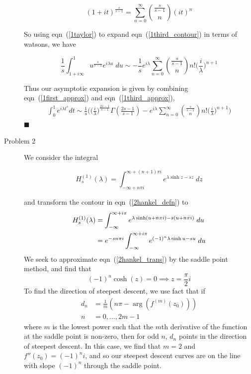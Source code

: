 \documentclass[11pt]{article}
\newcommand{\eq}[1]{\begin{align*}#1\end{align*}}
\newcommand{\eqn}[2]{
  \begin{equation}
    \label{#1}
    #2
  \end{equation}
}
\newcommand{\lam}{\lambda}
\newcommand{\eqr}[1]{eqn~(\ref{#1})}
\begin{document}
\begin{description}
\eqn{1taylor}{
  (1 + it)^\frac{s}{s-1} = 
  \sum_{n=0}^\infty
  \binom{\frac{s}{s-1}}{n}
  (it)^n
}
So using \eqr{1taylor} to expand \eqr{1third_contour} in terms of watsons, we have
\eqn{1third_approx}{
  \frac{1}{s} \int_{1+i\infty}^{1} u^\frac{s}{s-1} e^{i\lam u} \; du
  \sim
  -\frac{1}{s}
  e^{i\lam}
  \sum_{n=0}^\infty
  \binom{\frac{s}{s-1}}{n}
  n!
  \bigg(\frac{i}{\lam}\bigg)^{n+1}
}
Thus our asymptotic expansion is given by combining \eqr{1first_approx} and \eqr{1third_approx},
\eq{
  \int_0^1 e^{i\lam t^s} dt
  \sim
  \frac{1}{s}
  \Bigg(
    \bigg(\frac{i}{\lam}\bigg)^\frac{2s-1}{s-1}
    \Gamma(
      \frac{2s-1}{s-1}
    )
    -
    e^{i\lam}
    \sum_{n=0}^\infty
    \binom{\frac{s}{s-1}}{n}
    n!
    \bigg(\frac{i}{\lam}\bigg)^{n+1}
  \Bigg)
}
\hfill $\blacksquare$
\item[Problem 2]
We consider the integral
\eqn{2hankel_defn}{
  H_s^{(1)}(\lam) = \int_{
    -\infty + n\pi i
  }^{
    \infty + (n+1)\pi i
  }
  e^{
    \lam\sinh z - sz
  }
  \; dz
}
and transform the contour in \eqr{2hankel_defn} to
\begin{align}
  \notag
  H_s^{(1)}(\lam) &= \int
  _{-\infty}
  ^{\infty + i\pi}
  e^{
    \lam \sinh(u + n\pi i) - s(u + n\pi i)
  }
  \; du
  \\
  \label{2hankel_trans}
  &=
  e^{-sn\pi i}
  \int
  _{-\infty}
  ^{\infty + i\pi}
  e^{
    (-1)^n \lam \sinh u - su
  }
  \; du
\end{align}
We seek to approximate \eqr{2hankel_trans} by the saddle point method,
and find that
$$
  (-1)^n \cosh(z) = 0 \implies z = \frac{\pi}{2}i
$$
To find the direction of steepest descent, we use fact that if
\eq{
  d_n &= \frac{1}{m}(n\pi - \arg(f^{(m)}(z_0))) \\
  n &= 0, \ldots, 2m-1
}
where $m$ is the lowest power such that the $m$th derivative of the function at the saddle point is
non-zero, then for odd $n$, $d_n$ points in the direction of steepest descent.
In this case, we find that $m = 2$ and $f''(z_0) = (-1)^n i$, and so our steepest
descent curves are on the line with slope $(-1)^n$ through the saddle point.


\end{description}
\end{document}
